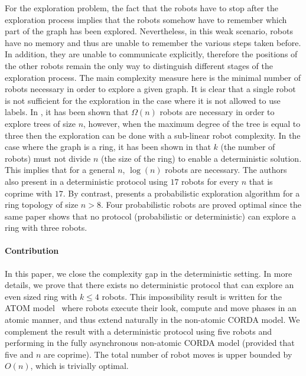 \documentclass[12pt]{llncs}
\begin{document}
For the exploration problem, the fact that the robots have to stop after the exploration process implies that the robots somehow have to remember which part of the graph has been explored. Nevertheless, in this weak scenario, robots have no memory and thus are unable to remember the various steps taken before. In addition, they are unable to communicate explicitly, therefore the positions of the other robots remain the only way to distinguish different stages of the exploration process. The main complexity measure here is the minimal number of robots necessary in order to explore a given graph. It is clear that a single robot is not sufficient for the exploration in the case where it is not allowed to use labels. In \cite{davi08}, it has been shown that $\Omega(n)$ robots are necessary in order to explore trees of size $n$, however, when the maximum degree of the tree is equal to three then the exploration can be done with a sub-linear robot complexity. In the case where the graph is a ring, it has been shown in \cite{davi07} that $k$ (the number of robots) must not divide $n$ (the size of the ring) to enable a deterministic solution. This implies that for a general $n$, $\log(n)$ robots are necessary. The authors also present in \cite{davi07} a deterministic protocol using $17$ robots for every $n$ that is coprime with $17$. By contrast, \cite{stap09} presents a probabilistic exploration algorithm for a ring topology of size $n> 8$. Four probabilistic robots are proved optimal since the same paper shows that no protocol (probabilistic or deterministic) can explore a ring with three robots.

\paragraph{\textbf{Contribution}}\label{sec:Contribution}

In this paper, we close the complexity gap in the deterministic setting. In more details, we prove that there exists no deterministic protocol that can explore an even sized ring with $k\leq 4$ robots. This impossibility result is written for the ATOM model~\cite{yama99} where robots execute their look, compute and move phases in an atomic manner, and thus extend naturally in the non-atomic CORDA model. We complement the result with a deterministic protocol using five robots and performing in the fully asynchronous non-atomic CORDA model \cite{Pre01} (provided that five and $n$ are coprime). The total number of robot moves is upper bounded by $O(n)$, which is trivially optimal. 
\end{document}
